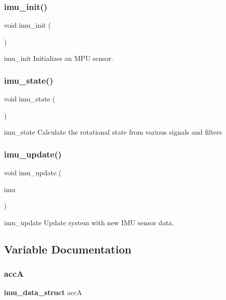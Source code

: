 \subsubsection{imu\+\_\+init()}
{\footnotesize\ttfamily void imu\+\_\+init (\begin{DoxyParamCaption}\item[{void}]{ }\end{DoxyParamCaption})}

imu\+\_\+init Initializes an M\+PU sensor. \mbox{\label{imu_8h_a5ca8497ef3bdd15a3b779302d2c1acc1}} 
\subsubsection{imu\+\_\+state()}
{\footnotesize\ttfamily void imu\+\_\+state (\begin{DoxyParamCaption}\item[{void}]{ }\end{DoxyParamCaption})}

imu\+\_\+state Calculate the rotational state from various signals and filters \mbox{\label{imu_8h_a38a1db0ae278088ee76fc6db380f209a}} 
\subsubsection{imu\+\_\+update()}
{\footnotesize\ttfamily void imu\+\_\+update (\begin{DoxyParamCaption}\item[{\textbf{ imu\+\_\+struct} $\ast$}]{imu }\end{DoxyParamCaption})}

imu\+\_\+update Update system with new I\+MU sensor data. 

\subsection{Variable Documentation}
\mbox{\label{imu_8h_aaa86e02e99fe5901163e565899243c81}} 
\subsubsection{accA}
{\footnotesize\ttfamily \textbf{ imu\+\_\+data\+\_\+struct} accA}

